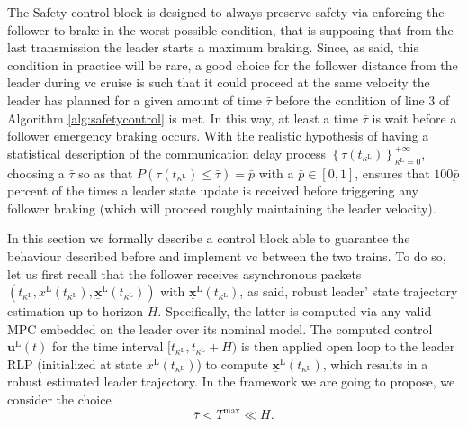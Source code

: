 \documentclass[letterpaper, 10 pt, conference]{ieeeconf}
\theoremstyle{definition}
\theoremstyle{nopoint}
\begin{document}
The Safety control block is designed to always preserve safety via enforcing the follower to brake in the worst possible condition, that is supposing that from the last transmission the leader starts a maximum braking. Since, as said, this condition in practice will be rare, a good choice for the follower distance from the leader during \gls{vc} cruise is such that it could proceed at the same velocity the leader has planned for a given amount of time $\bar{\tau}$ before the condition of line  $3$ of  Algorithm \ref{alg:safetycontrol} is met. In this way, at least a time $\bar{\tau}$ is wait before a follower emergency braking occurs. 
With the realistic hypothesis of having a statistical description of the communication delay process $ \left\{ \tau(t_{\kappa^\mathrm{L}})\right\}_{\kappa^\mathrm{L}=0}^{+\infty}$, 
choosing a $\bar{\tau}$ so as that  $P( \tau(t_{\kappa^\mathrm{L}})\leq \bar{\tau})=\bar{p}$ with a $\bar{p}\in [0,1]$, ensures that $100 \bar{p}$ percent of the times a leader state update is received before triggering any follower braking (which will proceed roughly maintaining the leader velocity).
 
In this section we formally describe a control block able to guarantee the behaviour described before and implement \gls{vc} between the two trains.  
To do so, let us first recall that the follower receives asynchronous packets $\left ( t_{\kappa^\mathrm{L}}, x^\mathrm{L}(t_{\kappa^\mathrm{L}}),\underline{\mathbf{x}}^\mathrm{L}(t_{\kappa^\mathrm{L}})\right)$ with $\underline{\mathbf{x}}^\mathrm{L}(t_{\kappa^\mathrm{L}})$, as said, robust leader' state trajectory estimation up to horizon $H$. Specifically, the latter is computed via any valid MPC embedded on the leader over its nominal model. The computed control $\mathbf{u}^\mathrm{L}(t)$ for the time interval  $[t_{\kappa^\mathrm{L}},t_{\kappa^\mathrm{L}}+H)$ is then applied open loop to the leader RLP (initialized at state $x^\mathrm{L}(t_{\kappa^\mathrm{L}})$) to compute $\underline{\mathbf{x}}^\mathrm{L}(t_{\kappa^\mathrm{L}})$, which results in a robust estimated leader trajectory. 
In the framework we are going to propose, we consider the choice
\begin{equation}\label{eq:tau_H_inequality}
\bar{\tau} < T^{\max}\ll H.
\end{equation}
\end{document}
